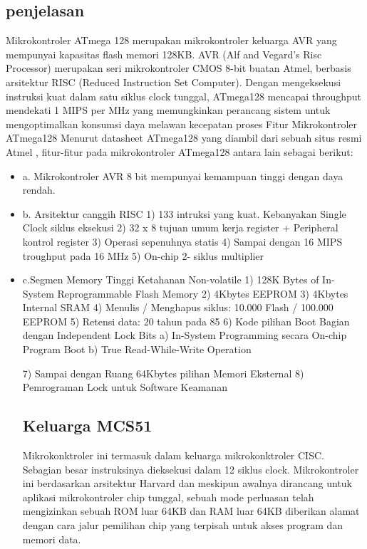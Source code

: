 	\subsection{penjelasan}
	Mikrokontroler ATmega 128 merupakan mikrokontroler keluarga AVR yang mempunyai kapasitas flash memori 128KB. AVR (Alf and Vegard’s Risc Processor) merupakan seri mikrokontroler CMOS 8-bit buatan Atmel, berbasis arsitektur RISC (Reduced Instruction Set Computer). Dengan mengeksekusi instruksi kuat dalam satu siklus clock tunggal, ATmega128 mencapai throughput mendekati 1 MIPS per MHz yang memungkinkan perancang sistem untuk mengoptimalkan konsumsi daya melawan kecepatan proses
	Fitur Mikrokontroler ATmega128
	Menurut datasheet ATmega128 yang diambil dari sebuah situs resmi Atmel , fitur-fitur pada mikrokontroler ATmega128 antara lain sebagai berikut:
	\begin{itemize}
		\item a. Mikrokontroler AVR 8 bit mempunyai kemampuan tinggi dengan daya rendah. 
		\item b. Arsitektur canggih RISC
				1) 133 intruksi yang kuat. Kebanyakan Single Clock siklus eksekusi 
				2) 32 x 8 tujuan umum kerja register + Peripheral kontrol register 
				3) Operasi sepenuhnya statis 
				4) Sampai dengan 16 MIPS troughput pada 16 MHz
				5) On-chip 2- siklus multiplier
		\item c.Segmen Memory Tinggi Ketahanan Non-volatile 
				1) 128K Bytes of In-System Reprogrammable Flash Memory
				2) 4Kbytes EEPROM
				3) 4Kbytes Internal SRAM
				4) Menulis / Menghapus siklus: 10.000 Flash / 100.000 EEPROM 
				5) Retensi data: 20 tahun pada 85 
				6) Kode pilihan Boot Bagian dengan Independent Lock Bits 
					a) In-System Programming secara On-chip Program Boot 
					b) True Read-While-Write Operation 
					
				7) Sampai dengan Ruang 64Kbytes pilihan Memori Eksternal
				8) Pemrograman Lock untuk Software Keamanan
				\subsection{Keluarga MCS51}
Mikrokonktroler ini termasuk dalam keluarga mikrokonktroler CISC. Sebagian besar instruksinya dieksekusi dalam 12 siklus clock. Mikrokontroler ini berdasarkan arsitektur Harvard dan meskipun awalnya dirancang untuk aplikasi mikrokontroler chip tunggal, sebuah mode perluasan telah mengizinkan sebuah ROM luar 64KB dan RAM luar 64KB diberikan alamat dengan cara jalur pemilihan chip yang terpisah untuk akses program dan memori data.


\end{itemize}
